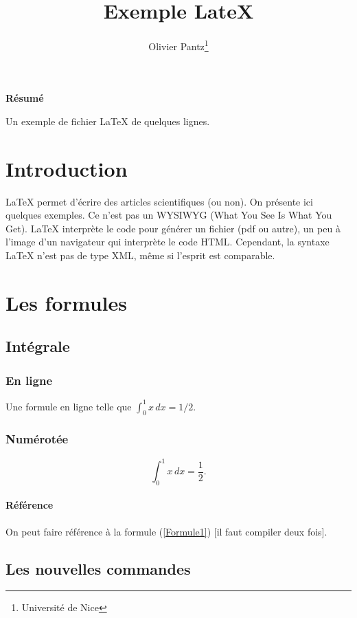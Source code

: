 \documentclass{article}
\title{Exemple LateX}
\author{Olivier Pantz\footnote{Universit\'e de Nice}}	%
\begin{document}
\maketitle						%

\tableofcontents					%
\listoffigures						%


\begin{center}
\textbf{R\'esum\'e}
\end{center}
Un exemple de fichier {\LaTeX} de quelques lignes.

\section{Introduction}
{\LaTeX} permet d'\'ecrire des articles scientifiques (ou non). On pr\'esente ici quelques exemples.
Ce n'est pas un WYSIWYG (What You See Is What You Get).  {\LaTeX} interpr\`ete le code
pour g\'en\'erer un fichier (pdf ou autre), un peu \`a l'image d'un navigateur qui interpr\`ete le code HTML.
Cependant, la syntaxe {\LaTeX}  n'est pas de type XML, m\^eme si l'esprit est comparable.

\section{Les formules}
\subsection{Int\'egrale}
\subsubsection{En ligne}
Une formule en ligne telle que $\int_0^1 x\,dx=1/2$.
\subsubsection{Num\'erot\'ee}
\begin{equation}\label{Formule1}
\int_0^1 x\,dx=\frac 1 2.
\end{equation}
\paragraph{R\'ef\'erence} On peut faire r\'ef\'erence \`a la formule (\ref{Formule1}) [il faut compiler deux fois].
\subsection{Les nouvelles commandes}
\end{document}
